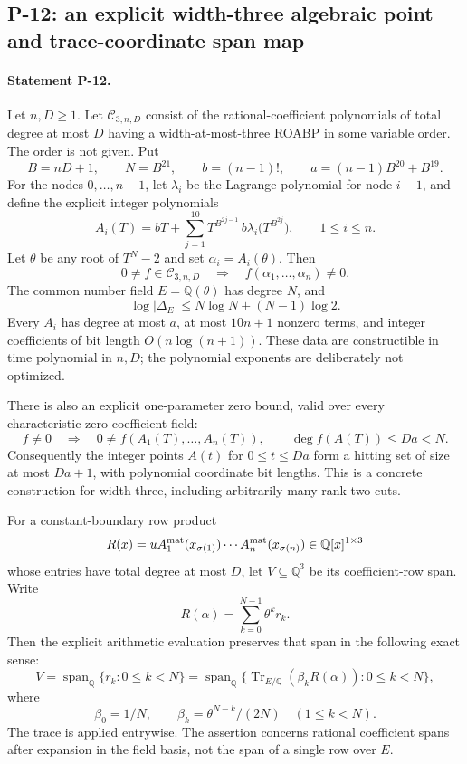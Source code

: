 \subsection{P-12: an explicit width-three algebraic point and trace-coordinate span map}
\paragraph{Statement P-12.}
Let $n,D\ge1$.  Let $\mathcal C_{3,n,D}$ consist of the rational-coefficient polynomials of total degree at most $D$ having a width-at-most-three ROABP in some variable order.  The order is not given.  Put
\[
 B=nD+1,\qquad N=B^{21},\qquad b=(n-1)!,\qquad
 a=(n-1)B^{20}+B^{19}.
\]
For the nodes $0,\ldots,n-1$, let $\lambda_i$ be the Lagrange polynomial for node $i-1$, and define the explicit integer polynomials
\[
 A_i(T)=bT+
    \sum_{j=1}^{10}T^{B^{2j-1}}\,
       b\lambda_i\bigl(T^{B^{2j}}\bigr),
       \qquad 1\le i\le n.
 \tag{P12.1}
\]
Let $\theta$ be any root of $T^N-2$ and set $\alpha_i=A_i(\theta)$.  Then
\[
 0\ne f\in\mathcal C_{3,n,D}\quad\Longrightarrow\quad
 f(\alpha_1,\ldots,\alpha_n)\ne0.
 \tag{P12.2}
\]
The common number field $E=\mathbb Q(\theta)$ has degree $N$, and
\[
 \log|\Delta_E|\le N\log N+(N-1)\log2.
 \tag{P12.3}
\]
Every $A_i$ has degree at most $a$, at most $10n+1$ nonzero terms, and integer coefficients of bit length $O(n\log(n+1))$.  These data are constructible in time polynomial in $n,D$; the polynomial exponents are deliberately not optimized.

There is also an explicit one-parameter zero bound, valid over every characteristic-zero coefficient field:
\[
 f\ne0\quad\Longrightarrow\quad
 0\ne f(A_1(T),\ldots,A_n(T)),\qquad
 \deg f(A(T))\le Da<N.
 \tag{P12.4}
\]
Consequently the integer points $A(t)$ for $0\le t\le Da$ form a hitting set of size at most $Da+1$, with polynomial coordinate bit lengths.  This is a concrete construction for width three, including arbitrarily many rank-two cuts.

For a constant-boundary row product
\[
 R(x)=uA^{\rm mat}_1(x_{\sigma(1)})\cdots
          A^{\rm mat}_n(x_{\sigma(n)})\in\mathbb Q[x]^{1\times3}
\]
whose entries have total degree at most $D$, let $V\subseteq\mathbb Q^3$ be its coefficient-row span.  Write
\[
 R(\alpha)=\sum_{k=0}^{N-1}\theta^k r_k.
\]
Then the explicit arithmetic evaluation preserves that span in the following exact sense:
\[
 V=\operatorname{span}_{\mathbb Q}\{r_k:0\le k<N\}
  =\operatorname{span}_{\mathbb Q}
       \{\operatorname{Tr}_{E/\mathbb Q}(\beta_k R(\alpha)):0\le k<N\},
 \tag{P12.5}
\]
where
\[
 \beta_0=1/N,\qquad \beta_k=\theta^{N-k}/(2N)\quad(1\le k<N).
\]
The trace is applied entrywise.  The assertion concerns rational coefficient spans after expansion in the field basis, not the span of a single row over $E$.

